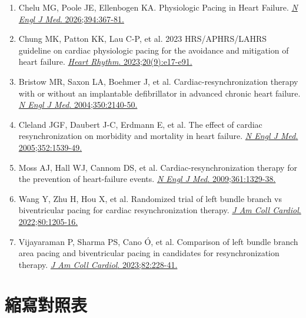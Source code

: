 \documentclass[12pt,a4paper]{article}
\begin{document}
\begin{enumerate}
    \item Chelu MG, Poole JE, Ellenbogen KA. Physiologic Pacing in Heart Failure. \href{https://doi.org/10.1056/NEJMra2415650}{\textit{N Engl J Med}. 2026;394:367-81.}

    \item Chung MK, Patton KK, Lau C-P, et al. 2023 HRS/APHRS/LAHRS guideline on cardiac physiologic pacing for the avoidance and mitigation of heart failure. \href{https://doi.org/10.1016/j.hrthm.2023.03.1538}{\textit{Heart Rhythm}. 2023;20(9):e17-e91.}

    \item Bristow MR, Saxon LA, Boehmer J, et al. Cardiac-resynchronization therapy with or without an implantable defibrillator in advanced chronic heart failure. \href{https://doi.org/10.1056/NEJMoa032423}{\textit{N Engl J Med}. 2004;350:2140-50.}

    \item Cleland JGF, Daubert J-C, Erdmann E, et al. The effect of cardiac resynchronization on morbidity and mortality in heart failure. \href{https://doi.org/10.1056/NEJMoa050496}{\textit{N Engl J Med}. 2005;352:1539-49.}

    \item Moss AJ, Hall WJ, Cannom DS, et al. Cardiac-resynchronization therapy for the prevention of heart-failure events. \href{https://doi.org/10.1056/NEJMoa0906431}{\textit{N Engl J Med}. 2009;361:1329-38.}

    \item Wang Y, Zhu H, Hou X, et al. Randomized trial of left bundle branch vs biventricular pacing for cardiac resynchronization therapy. \href{https://doi.org/10.1016/j.jacc.2022.07.019}{\textit{J Am Coll Cardiol}. 2022;80:1205-16.}

    \item Vijayaraman P, Sharma PS, Cano Ó, et al. Comparison of left bundle branch area pacing and biventricular pacing in candidates for resynchronization therapy. \href{https://doi.org/10.1016/j.jacc.2023.05.006}{\textit{J Am Coll Cardiol}. 2023;82:228-41.}
\end{enumerate}

\section{縮寫對照表}
\end{document}
